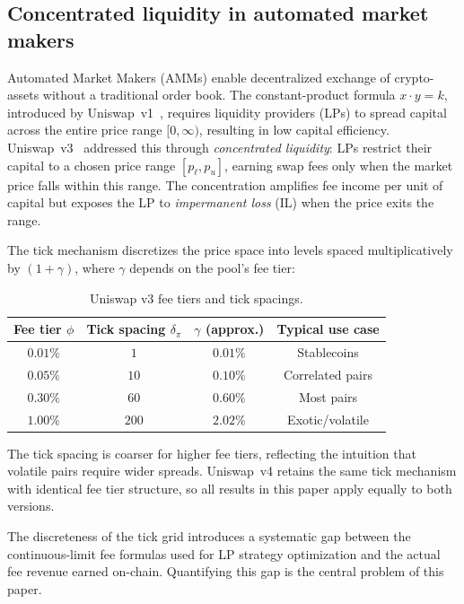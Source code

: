 \documentclass[11pt]{article}
\theoremstyle{definition}
\theoremstyle{remark}
\begin{document}
\subsection{Concentrated liquidity in automated market makers}

Automated Market Makers (AMMs) enable decentralized exchange of
crypto-assets without a traditional order book. The constant-product
formula $x \cdot y = k$, introduced by Uniswap~v1~\citep{Adams2021},
requires liquidity providers (LPs) to spread capital across the entire
price range $[0, \infty)$, resulting in low capital efficiency.
Uniswap~v3~\citep{Adams2021} addressed this through
\emph{concentrated liquidity}: LPs restrict their capital to a chosen
price range $[p_\ell, p_u]$, earning swap fees only when the market
price falls within this range. The concentration amplifies fee income
per unit of capital but exposes the LP to \emph{impermanent loss} (IL)
when the price exits the range.

The tick mechanism discretizes the price space into levels spaced
multiplicatively by $(1 + \gamma)$, where $\gamma$ depends on the
pool's fee tier:
\begin{table}[h]
\centering
\caption{Uniswap v3 fee tiers and tick spacings.}
\label{tab:fee_tiers}
\begin{tabular}{cccc}
\toprule
Fee tier $\phi$ & Tick spacing $\delta_\pi$ & $\gamma$ (approx.)
& Typical use case \\
\midrule
$0.01\%$ & $1$ & $0.01\%$ & Stablecoins \\
$0.05\%$ & $10$ & $0.10\%$ & Correlated pairs \\
$0.30\%$ & $60$ & $0.60\%$ & Most pairs \\
$1.00\%$ & $200$ & $2.02\%$ & Exotic/volatile \\
\bottomrule
\end{tabular}
\end{table}

\noindent
The tick spacing is coarser for higher fee tiers, reflecting the
intuition that volatile pairs require wider spreads. Uniswap~v4
retains the same tick mechanism with identical fee tier structure, so
all results in this paper apply equally to both versions.

The discreteness of the tick grid introduces a systematic gap between
the continuous-limit fee formulas used for LP strategy optimization and
the actual fee revenue earned on-chain. Quantifying this gap is the
central problem of this paper.

\end{document}
